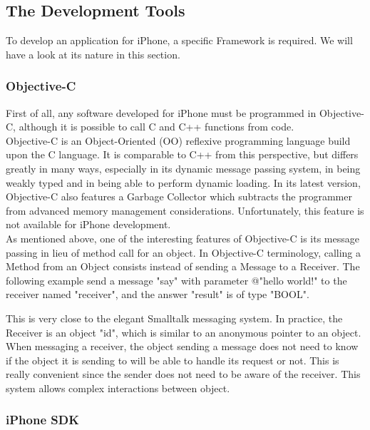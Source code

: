 \subsection{The Development Tools}

To develop an application for iPhone, a specific Framework is required. We will have a look at its nature in this section.

\subsubsection{Objective-C}

First of all, any software developed for iPhone must be programmed in Objective-C, although it is possible to call C and C++ functions from code.\\

Objective-C is an Object-Oriented (OO) reflexive programming language build upon the C language. It is comparable to C++ from this perspective, but differs greatly in many ways, especially in its dynamic message passing system, in being weakly typed and in being able to perform dynamic loading. In its latest version, Objective-C also features a Garbage Collector which subtracts the programmer from advanced memory management considerations. Unfortunately, this feature is not available for iPhone development.\\

As mentioned above, one of the interesting features of Objective-C is its message passing in lieu of method call for an object. In Objective-C terminology, calling a Method from an Object consists instead of sending a Message to a Receiver. The following example send a message "say" with parameter @"hello world!"  to the receiver named "receiver", and the answer "result" is of type "BOOL".

\parbox{15cm}{

}

This is very close to the elegant Smalltalk messaging system. In practice, the Receiver is an object "id", which is similar to an anonymous pointer to an object. When messaging a receiver, the object sending a message does not need to know if the object it is sending to will be able to handle its request or not. This is really convenient since the sender does not need to be aware of the receiver. This system allows complex interactions between object.

\subsubsection{iPhone SDK}

